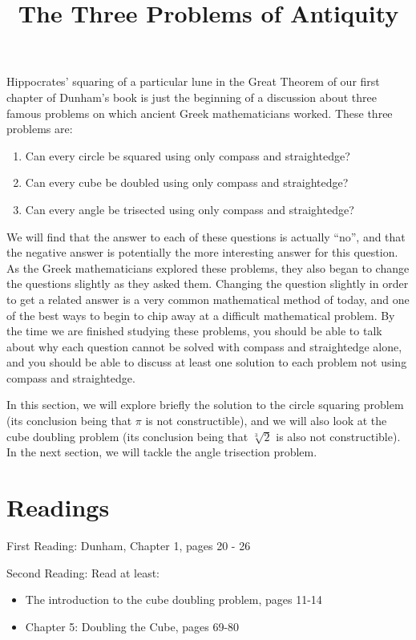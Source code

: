 \documentclass{ximera}
\title{The Three Problems of Antiquity}
\begin{document}
\begin{abstract}
\end{abstract}
\maketitle

Hippocrates' squaring of a particular lune in the Great Theorem of our first chapter of Dunham's book is just the beginning of a discussion about three famous problems on which ancient Greek mathematicians worked.  These three problems are:
\begin{enumerate}
	\item Can every circle be squared using only compass and straightedge?
	\item Can every cube be doubled using only compass and straightedge?
	\item Can every angle be trisected using only compass and straightedge?
\end{enumerate}
We will find that the answer to each of these questions is actually ``no'', and that the negative answer is potentially the more interesting answer for this question.  As the Greek mathematicians explored these problems, they also began to change the questions slightly as they asked them.  Changing the question slightly in order to get a related answer is a very common mathematical method of today, and one of the best ways to begin to chip away at a difficult mathematical problem.  By the time we are finished studying these problems, you should be able to talk about why each question cannot be solved with compass and straightedge alone, and you should be able to discuss at least one solution to each problem not using compass and straightedge.

In this section, we will explore briefly the solution to the circle squaring problem (its conclusion being that $\pi$ is not constructible), and we will also look at the cube doubling problem (its conclusion being that $\sqrt[3]{2}$ is also not constructible).  In the next section, we will tackle the angle trisection problem.



\section{Readings}

First Reading: Dunham, Chapter 1, pages 20 - 26

Second Reading: 
Read at least:
\begin{itemize}
	\item The introduction to the cube doubling problem, pages 11-14
	\item Chapter 5: Doubling the Cube, pages 69-80
\end{itemize}
\end{document}
